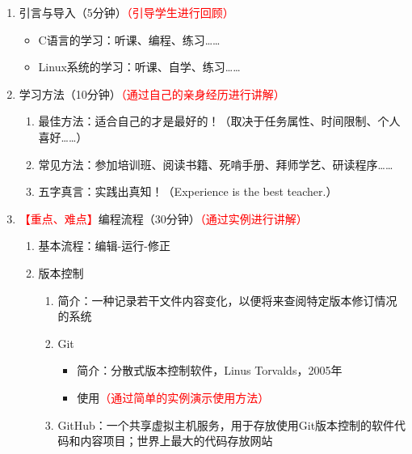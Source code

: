 \documentclass{TIJMUjiaoanLL}
\begin{document}
\begin{enumerate}
  \item 引言与导入（5分钟）\textcolor{red}{（引导学生进行回顾）}
    \begin{itemize}
      \item C语言的学习：听课、编程、练习……
      \item Linux系统的学习：听课、自学、练习……
    \end{itemize}
  \item 学习方法（10分钟）\textcolor{red}{（通过自己的亲身经历进行讲解）}
    \begin{enumerate}
      \item 最佳方法：适合自己的才是最好的！（取决于任务属性、时间限制、个人喜好……）
      \item 常见方法：参加培训班、阅读书籍、死啃手册、拜师学艺、研读程序……
      \item 五字真言：实践出真知！（Experience is the best teacher.）
    \end{enumerate}
  \item \textcolor{red}{【重点、难点】}编程流程（30分钟）\textcolor{red}{（通过实例进行讲解）}
    \begin{enumerate}
      \item 基本流程：编辑-运行-修正
      \item 版本控制
	\begin{enumerate}
	  \item 简介：一种记录若干文件内容变化，以便将来查阅特定版本修订情况的系统
	  \item Git
	    \begin{itemize}
	      \item 简介：分散式版本控制软件，Linus Torvalds，2005年
	      \item 使用\textcolor{red}{（通过简单的实例演示使用方法）}
	    \end{itemize}
	  \item GitHub：一个共享虚拟主机服务，用于存放使用Git版本控制的软件代码和内容项目；世界上最大的代码存放网站
	\end{enumerate}
\vspace*{-1em}
\end{enumerate}
\end{enumerate}
\end{document}
